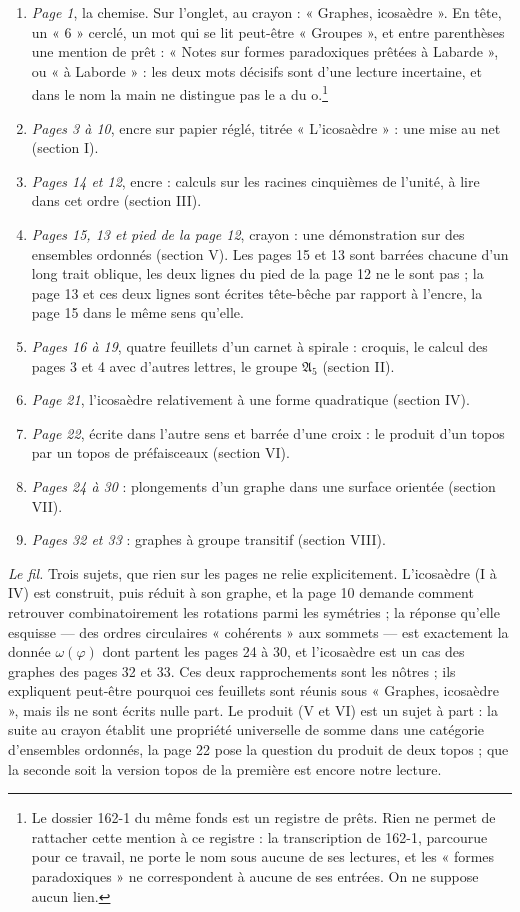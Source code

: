 \documentclass[11pt,a4paper]{article}
\begin{document}
\begin{enumerate}
  \item \emph{Page 1}, la chemise. Sur l'onglet, au crayon : « Graphes,
  icosaèdre ». En tête, un « 6 » cerclé, un mot qui se lit peut-être
  « Groupes », et entre parenthèses une mention de prêt : « Notes sur formes
  paradoxiques prêtées à Labarde », ou « à Laborde » : les deux mots décisifs
  sont d'une lecture incertaine, et dans le nom la main ne distingue pas le
  a du o.\footnote{Le dossier 162-1 du même fonds est un registre de prêts.
  Rien ne permet de rattacher cette mention à ce registre : la
  transcription de 162-1, parcourue pour ce travail, ne porte le nom sous
  aucune de ses lectures, et les « formes paradoxiques » ne correspondent à
  aucune de ses entrées. On ne suppose aucun lien.}
  \item \emph{Pages 3 à 10}, encre sur papier réglé, titrée « L'icosaèdre » :
  une mise au net (section I).
  \item \emph{Pages 14 et 12}, encre : calculs sur les racines cinquièmes de
  l'unité, à lire dans cet ordre (section III).
  \item \emph{Pages 15, 13 et pied de la page 12}, crayon : une démonstration
  sur des ensembles ordonnés (section V). Les pages 15 et 13 sont barrées
  chacune d'un long trait oblique, les deux lignes du pied de la page 12 ne le
  sont pas ; la page 13 et ces deux lignes sont écrites tête-bêche par rapport
  à l'encre, la page 15 dans le même sens qu'elle.
  \item \emph{Pages 16 à 19}, quatre feuillets d'un carnet à spirale :
  croquis, le calcul des pages 3 et 4 avec d'autres lettres, le groupe $\mathfrak{A}_5$
  (section II).
  \item \emph{Page 21}, l'icosaèdre relativement à une forme quadratique
  (section IV).
  \item \emph{Page 22}, écrite dans l'autre sens et barrée d'une croix : le
  produit d'un topos par un topos de préfaisceaux (section VI).
  \item \emph{Pages 24 à 30} : plongements d'un graphe dans une surface
  orientée (section VII).
  \item \emph{Pages 32 et 33} : graphes à groupe transitif (section VIII).
\end{enumerate}

\emph{Le fil.} Trois sujets, que rien sur les pages ne relie explicitement.
L'icosaèdre (I à IV) est construit, puis réduit à son graphe, et la page 10
demande comment retrouver combinatoirement les rotations parmi les
symétries ; la réponse qu'elle esquisse --- des ordres circulaires
« cohérents » aux sommets --- est exactement la donnée $\omega(\varphi)$
dont partent les pages 24 à 30, et l'icosaèdre est un cas des graphes des
pages 32 et 33. Ces deux rapprochements sont les nôtres ; ils expliquent
peut-être pourquoi ces feuillets sont réunis sous « Graphes, icosaèdre »,
mais ils ne sont écrits nulle part. Le produit (V et VI) est un sujet à part :
la suite au crayon établit une propriété universelle de somme dans une
catégorie d'ensembles ordonnés, la page 22 pose la question du produit de
deux topos ; que la seconde soit la version topos de la première est encore
notre lecture.
\end{document}
